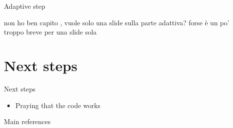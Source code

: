 \begin{frame}{Adaptive step}

   non ho ben capito , vuole solo una slide sulla parte adattiva?
   forse è un po' troppo breve per una slide sola

\end{frame}



\section{Next steps}
\begin{frame}{Next steps}

    \begin{itemize}
        \item Praying that the code works
    \end{itemize}



\end{frame}




\begin{frame}{Main references}
    \nocite{colombiLearningBlockStructured2022a}
    \nocite{mohammadiBayesianStructureLearning2015a}
    \nocite{legramantiExtendedStochasticBlock2022}
    \nocite{bensonAdaptiveMCMCMultiple2018}
    \nocite{martinezNonparametricChangePoint2014}
    
    
    \printbibliography
    \renewcommand*{\bibfont}{\small}
\end{frame}



